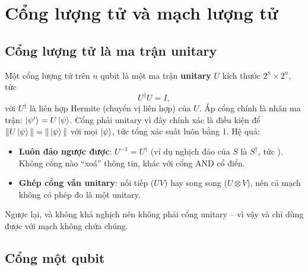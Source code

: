 \section{Cổng lượng tử và mạch lượng tử}
\label{sec:gates}

\subsection{Cổng lượng tử là ma trận unitary}
\label{sec:unitary}

Một cổng lượng tử trên $n$ qubit là một ma trận \textbf{unitary} $U$ kích thước $2^n\times 2^n$, tức
\begin{equation}
  U^\dagger U = I,
  \label{eq:unitary}
\end{equation}
với $U^\dagger$ là liên hợp Hermite (chuyển vị liên hợp) của $U$. Áp cổng chính là nhân ma trận:
$\ket{\psi'} = U\ket{\psi}$. Cổng phải unitary vì đây chính xác là điều kiện để
$\|U\ket{\psi}\| = \|\ket{\psi}\|$ với mọi $\ket{\psi}$, tức tổng xác suất luôn bằng 1. Hệ quả:
\begin{itemize}[noitemsep]
  \item \textbf{Luôn đảo ngược được}: $U^{-1} = U^\dagger$ (ví dụ nghịch đảo của $S$ là
    $S^\dagger$, tức ). Không cổng nào ``xoá'' thông tin, khác với cổng AND cổ điển.
  \item \textbf{Ghép cổng vẫn unitary}: nối tiếp ($UV$) hay song song ($U\otimes V$), nên cả mạch
    không có phép đo là một unitary.
\end{itemize}
Ngược lại,  và  không khả nghịch nên không phải cổng unitary -- vì vậy
 và  chỉ dùng được với mạch không chứa chúng.

\subsection{Cổng một qubit}
\label{sec:1q}


